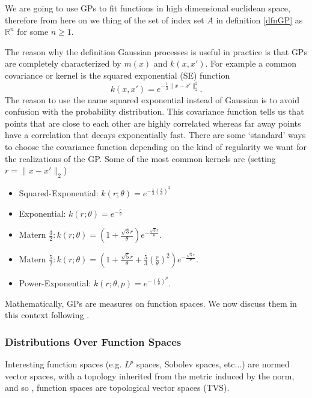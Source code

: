 \documentclass[12pt]{book}
\begin{document}
 

We are going to use GPs to fit  functions in  high dimensional euclidean space, therefore from 
here on we thing 
of the set of index set $A$ in definition \ref{dfnGP} as $\mathbb{R}^{n}$ for some $n\geq 1$. 
\newline

The reason why the definition  Gaussian processes is useful in practice is that  GPs are 
completely characterized by $m(x)$ and $k(x,x')$\cite{lifshits2012lectures}. 
 For example a  common covariance or kernel is the
 squared exponential (SE) function
\begin{equation}\label{eqnsquareexponential}
k(x,x')=e^{-\frac{1}{2}\|x-x'\|_{2}^{2}}.
\end{equation}
The reason to use the name squared exponential instead of Gaussian is to avoid confusion with
the probability distribution.
This  covariance function tells us that points that are close to each other
are highly correlated whereas far away points have a correlation that decays exponentially fast.
There are some `standard' ways to choose the covariance function depending on the kind
of regularity we want for the realizations of the GP.
Some of the most common kernels are \cite{rasmussen2006gaussian} (setting $r=\|x-x'\|_{2}$)

\begin{itemize}
\item Squared-Exponential: $k(r;\theta)=e^{-\frac{1}{2}(\frac{r}{\theta})^{2}}$
\item Exponential: $k(r;\theta)=e^{-\frac{r}{\theta}}$\\
\item Matern $\frac{3}{2}: k(r;\theta)=(1+\frac{\sqrt{3}r}{\theta})e^{-\frac{\sqrt{3}r}{\theta}}$.
\item Matern $\frac{5}{2}: k(r;\theta)=(1+\frac{\sqrt{5}r}{\theta}+\frac{5}{3}
(\frac{r}{\theta})^{2})e^{-\frac{\sqrt{5}r}{\theta}}$.
\item Power-Exponential: $k(r;\theta,p)=e^{-(\frac{r}{\theta})^{p}}$.
\end{itemize}

Mathematically, GPs are measures on function spaces. We now discuss them in this
context following \cite{lifshits2012lectures}.




\subsubsection{Distributions Over Function Spaces}
Interesting function spaces (e.g. $L^{p}$ spaces, Sobolev spaces, etc...) are 
normed vector spaces, with a topology inherited from the metric induced by the norm, and so 
, function spaces are topological vector spaces (TVS). 
\end{document}
